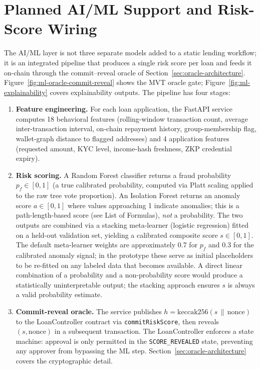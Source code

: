 \documentclass[12pt,a4paper]{report}
\begin{document}
\section{Planned AI/ML Support and Risk-Score Wiring}
\label{sec:aiml-support}

The AI/ML layer is not three separate models added to a static lending workflow; it is an integrated pipeline that produces a single risk score per loan and feeds it on-chain through the commit--reveal oracle of Section~\ref{sec:oracle-architecture}. Figure~\ref{fig:ml-oracle-commit-reveal} shows the MVT oracle gate; Figure~\ref{fig:ml-explainability} covers explainability outputs. The pipeline has four stages:

\begin{enumerate}[noitemsep]
\item \textbf{Feature engineering.} For each loan application, the FastAPI service computes 18 behavioral features (rolling-window transaction count, average inter-transaction interval, on-chain repayment history, group-membership flag, wallet-graph distance to flagged addresses) and 4 application features (requested amount, KYC level, income-hash freshness, ZKP credential expiry).
\item \textbf{Risk scoring.} A Random Forest classifier returns a fraud probability $p_f \in [0,1]$ (a true calibrated probability, computed via Platt scaling applied to the raw tree vote proportion). An Isolation Forest returns an anomaly score $a \in [0,1]$ where values approaching 1 indicate anomalies; this is a path-length-based score (see List of Formulas), \textit{not} a probability. The two outputs are combined via a stacking meta-learner (logistic regression) fitted on a held-out validation set, yielding a calibrated composite score $s \in [0,1]$. The default meta-learner weights are approximately 0.7 for $p_f$ and 0.3 for the calibrated anomaly signal; in the prototype these serve as initial placeholders to be re-fitted on any labeled data that becomes available. A direct linear combination of a probability and a non-probability score would produce a statistically uninterpretable output; the stacking approach ensures $s$ is always a valid probability estimate.
\item \textbf{Commit-reveal oracle.} The service publishes \(h = \mathrm{keccak256}(s \,\|\, \text{nonce})\) to the LoanController contract via \texttt{commitRiskScore}, then reveals $(s, \text{nonce})$ in a subsequent transaction. The LoanController enforces a state machine: approval is only permitted in the \texttt{SCORE\_REVEALED} state, preventing any approver from bypassing the ML step. Section~\ref{sec:oracle-architecture} covers the cryptographic detail.

\end{enumerate}
\end{document}
